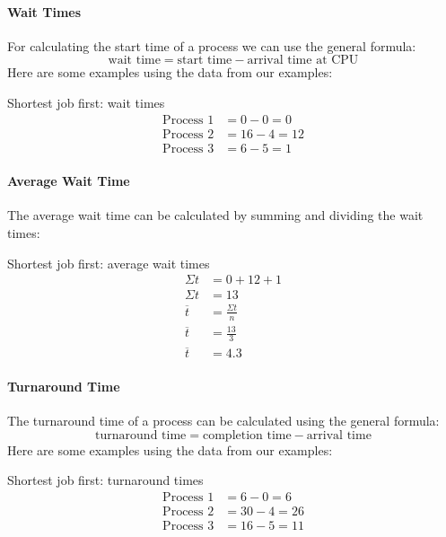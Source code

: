 \paragraph{Wait Times}\label{par:wait_times_1}

For calculating the start time of a process we can use the general formula:
\[
    \text{wait time} = \text{start time} - \text{arrival time at CPU}
\]
Here are some examples using the data from our examples:
\begin{highlight}{Shortest job first: wait times}
    \begin{align*}
        \text{Process \(1\)} & = 0 - 0 = 0   \\
        \text{Process \(2\)} & = 16 - 4 = 12 \\
        \text{Process \(3\)} & = 6 - 5 = 1
    \end{align*}
\end{highlight}

\paragraph{Average Wait Time}\label{par:average_wait_time_1}

The average wait time can be calculated by summing and dividing the wait times:
\begin{highlight}{Shortest job first: average wait times}
    \begin{align*}
        \Sigma t     & = 0 + 12 + 1         \\
        \Sigma t     & = 13                 \\
        \overline{t} & = \frac{\Sigma t}{n} \\
        \overline{t} & = \frac{13}{3}       \\
        \overline{t} & = 4.3
    \end{align*}
\end{highlight}

\paragraph{Turnaround Time}\label{par:turnaround_time_1}

The turnaround time of a process can be calculated using the general formula:
\[
    \text{turnaround time} = \text{completion time} - \text{arrival time}
\]
Here are some examples using the data from our examples:
\begin{highlight}{Shortest job first: turnaround times}
    \begin{align*}
        \text{Process \(1\)} & = 6 - 0 = 6   \\
        \text{Process \(2\)} & = 30 - 4 = 26 \\
        \text{Process \(3\)} & = 16 - 5 = 11
    \end{align*}
\end{highlight}

